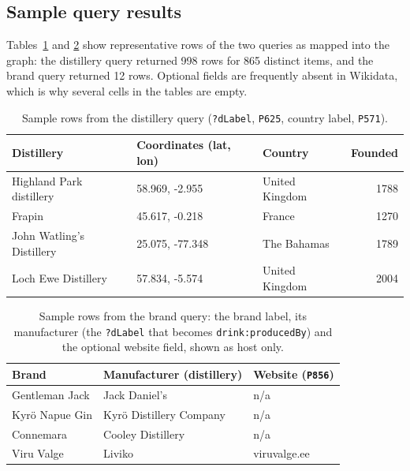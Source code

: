 \subsection{Sample query results}
\label{sec:query-samples}

Tables~\ref{tab:sample-distilleries} and \ref{tab:sample-brands} show
representative rows of the two queries as mapped into the graph: the distillery
query returned 998 rows for 865 distinct items, and the brand query returned 12
rows. Optional fields are frequently absent in Wikidata, which is why several
cells in the tables are empty.

\begin{table}[h]
  \centering
  \small
  \begin{tabular}{@{}lllr@{}}
    \toprule
    Distillery & Coordinates (lat, lon) & Country & Founded \\
    \midrule
    Highland Park distillery & 58.969, -2.955 & United Kingdom & 1788 \\
    Frapin & 45.617, -0.218 & France & 1270 \\
    John Watling's Distillery & 25.075, -77.348 & The Bahamas & 1789 \\
    Loch Ewe Distillery & 57.834, -5.574 & United Kingdom & 2004 \\
    \bottomrule
  \end{tabular}
  \caption{Sample rows from the distillery query (\texttt{?dLabel},
  \texttt{P625}, country label, \texttt{P571}).}
  \label{tab:sample-distilleries}
\end{table}

\begin{table}[h]
  \centering
  \small
  \begin{tabular}{@{}lll@{}}
    \toprule
    Brand & Manufacturer (distillery) & Website (\texttt{P856}) \\
    \midrule
    Gentleman Jack & Jack Daniel's & n/a \\
    Kyr\"o Napue Gin & Kyr\"o Distillery Company & n/a \\
    Connemara & Cooley Distillery & n/a \\
    Viru Valge & Liviko & viruvalge.ee \\
    \bottomrule
  \end{tabular}
  \caption{Sample rows from the brand query: the brand label, its manufacturer
  (the \texttt{?dLabel} that becomes \texttt{drink:producedBy}) and the
  optional website field, shown as host only.}
  \label{tab:sample-brands}
\end{table}

